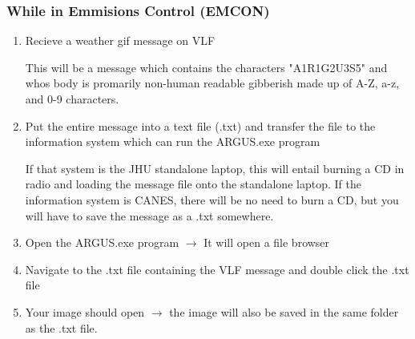 \subsubsection{While in Emmisions Control (EMCON)}
\begin{enumerate}
    \item Recieve a weather gif message on VLF
    \begin{addnote} This will be a message which contains the characters "A1R1G2U3S5" and whos body is promarily non-human readable gibberish made up of A-Z, a-z, and 0-9 characters.\end{addnote}
    \item Put the entire message into a text file (.txt) and transfer the file to the information system which can run the ARGUS.exe program
    \begin{addnote} If that system is the JHU standalone laptop, this will entail burning a CD in radio and loading the message file onto the standalone laptop.  If the information system is CANES, there will be no need to burn a CD, but you will have to save the message as a .txt somewhere. \end{addnote}
    \item Open the ARGUS.exe program $\rightarrow$ It will open a file browser
    \item Navigate to the .txt file containing the VLF message and double click the .txt file
    \item Your image should open $\rightarrow$ the image will also be saved in the same folder as the .txt file.
\end{enumerate}

